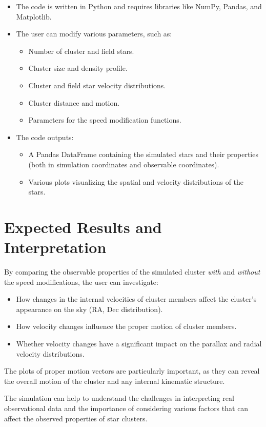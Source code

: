 \documentclass{article}
\begin{document}
	\begin{itemize}
		\item The code is written in Python and requires libraries like NumPy, Pandas, and Matplotlib. 
		\item The user can modify various parameters, such as:
		\begin{itemize}
			\item Number of cluster and field stars. 
			\item Cluster size and density profile. 
			\item Cluster and field star velocity distributions. 
			\item Cluster distance and motion. 
			\item Parameters for the speed modification functions. 
		\end{itemize}
		\item The code outputs:
		\begin{itemize}
			\item A Pandas DataFrame containing the simulated stars and their properties (both in simulation coordinates and observable coordinates). 
			\item Various plots visualizing the spatial and velocity distributions of the stars. 
		\end{itemize}
	\end{itemize}
	
	\section{Expected Results and Interpretation}
	
	By comparing the observable properties of the simulated cluster \textit{with} and \textit{without} the speed modifications, the user can investigate:
	
	\begin{itemize}
		\item How changes in the internal velocities of cluster members affect the cluster's appearance on the sky (RA, Dec distribution). 
		\item How velocity changes influence the proper motion of cluster members. 
		\item Whether velocity changes have a significant impact on the parallax and radial velocity distributions. 
	\end{itemize}
	
	The plots of proper motion vectors are particularly important, as they can reveal the overall motion of the cluster and any internal kinematic structure. 
	
	The simulation can help to understand the challenges in interpreting real observational data and the importance of considering various factors that can affect the observed properties of star clusters.
	
\end{document}
